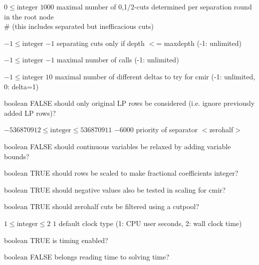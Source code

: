 %
{$0\leq\textrm{integer}$}%
{$1000$}%
{maximal number of {0,1/2}-cuts determined per separation round in the root node\\   \#                      (this includes separated but inefficacious cuts)}%
{}

%
{$-1\leq\textrm{integer}$}%
{$-1$}%
{separating cuts only if depth $<$= maxdepth (-1: unlimited)}%
{}

%
{$-1\leq\textrm{integer}$}%
{$-1$}%
{maximal number of calls (-1: unlimited)}%
{}

%
{$-1\leq\textrm{integer}$}%
{$10$}%
{maximal number of different deltas to try for cmir (-1: unlimited, 0: delta=1)}%
{}

%
{boolean}%
{FALSE}%
{should only original LP rows be considered (i.e. ignore previously added LP rows)?}%
{}

%
{$-536870912\leq\textrm{integer}\leq536870911$}%
{$-6000$}%
{priority of separator $<$zerohalf$>$}%
{}

%
{boolean}%
{FALSE}%
{should continuous variables be relaxed by adding variable bounds?}%
{}

%
{boolean}%
{TRUE}%
{should rows be scaled to make fractional coefficients integer?}%
{}

%
{boolean}%
{TRUE}%
{should negative values also be tested in scaling for cmir?}%
{}

%
{boolean}%
{TRUE}%
{should zerohalf cuts be filtered using a cutpool?}%
{}

%
{$1\leq\textrm{integer}\leq2$}%
{$1$}%
{default clock type (1: CPU user seconds, 2: wall clock time)}%
{}

%
{boolean}%
{TRUE}%
{is timing enabled?}%
{}

%
{boolean}%
{FALSE}%
{belongs reading time to solving time?}%
{}

